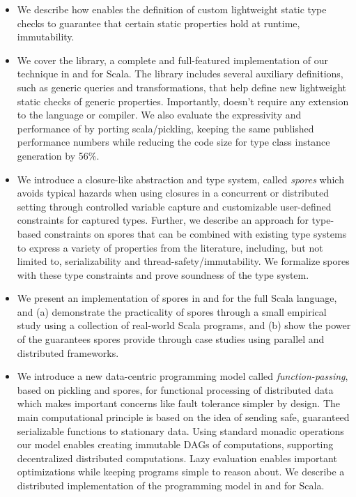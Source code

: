 \begin{itemize}
  \item We describe how \selfassembly enables the definition
  of custom lightweight static type checks to guarantee that certain static
  properties hold at runtime, \eg immutability.

  \item We cover the \selfassembly library, a complete and full-featured
  implementation of our technique in and for Scala. The library includes several
  auxiliary definitions, such as generic queries and transformations, that help
  define new lightweight static checks of generic properties. Importantly,
  \selfassembly doesn't require any extension to the language or compiler. We also evaluate
  the expressivity and performance of \selfassembly by porting scala/pickling, keeping the same published performance numbers while
  reducing the code size for type class instance generation by 56\%.

	\item We introduce a closure-like abstraction and type system, called {\em spores} which avoids typical hazards when using closures in a concurrent or distributed setting through controlled variable capture and customizable user-defined constraints for captured types. Further, we describe an approach for type-based constraints on spores that can be combined with existing type systems to express a variety of properties from the literature, including, but not limited to, serializability and thread-safety/immutability. We formalize spores with these type constraints and prove soundness of the type system.

	\item We present an implementation of spores in and for the full Scala language, and (a) demonstrate the practicality of spores through a small empirical study using a collection of real-world Scala programs, and (b) show the power of the guarantees
spores provide through case studies using parallel and distributed frameworks.

    \item We introduce a new data-centric programming model called {\em function-passing}, based on pickling and spores, for functional processing of distributed data which makes important concerns like fault tolerance simpler by design. The main computational principle is based on the idea of sending safe, guaranteed serializable functions to stationary data. Using standard monadic operations our model enables creating immutable DAGs of computations, supporting decentralized distributed computations. Lazy evaluation enables important optimizations while keeping programs simple to reason about. We describe a distributed implementation of the programming model in and for Scala.


\end{itemize}
